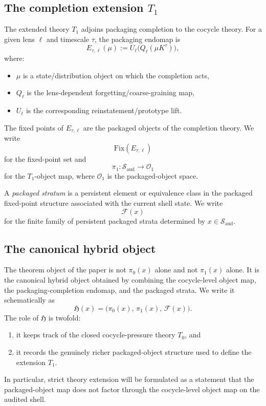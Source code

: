 \documentclass[11pt]{article}
\theoremstyle{definition}
\newcommand{\Tzero}{T_0}
\newcommand{\Tone}{T_1}
\begin{document}
\subsection{The completion extension \texorpdfstring{$\Tone$}{T1}}

The extended theory \(\Tone\) adjoins packaging completion to the cocycle theory. For a given lens \(\ell\) and timescale \(\tau\), the packaging endomap is
\[
E_{\tau,\ell}(\mu):=U_{\ell}\!\bigl(Q_{\ell}(\mu K^{\tau})\bigr),
\]
where:
\begin{itemize}
    \item \(\mu\) is a state/distribution object on which the completion acts,
    \item \(Q_{\ell}\) is the lens-dependent forgetting/coarse-graining map,
    \item \(U_{\ell}\) is the corresponding reinstatement/prototype lift.
\end{itemize}
The fixed points of \(E_{\tau,\ell}\) are the packaged objects of the completion theory. We write
\[
\mathrm{Fix}(E_{\tau,\ell})
\]
for the fixed-point set and
\[
\pi_1:\mathcal{S}_{\mathrm{aud}}\to \mathcal{O}_1
\]
for the \(\Tone\)-object map, where \(\mathcal{O}_1\) is the packaged-object space.

A \emph{packaged stratum} is a persistent element or equivalence class in the packaged fixed-point structure associated with the current shell state. We write
\[
\mathcal{F}(x)
\]
for the finite family of persistent packaged strata determined by \(x\in \mathcal{S}_{\mathrm{aud}}\).

\subsection{The canonical hybrid object}

The theorem object of the paper is not \(\pi_0(x)\) alone and not \(\pi_1(x)\) alone. It is the canonical hybrid object obtained by combining the cocycle-level object map, the packaging-completion endomap, and the packaged strata. We write it schematically as
\[
\mathfrak{H}(x)=\bigl(\pi_0(x),\,\pi_1(x),\,\mathcal{F}(x)\bigr).
\]
The role of \(\mathfrak{H}\) is twofold:
\begin{enumerate}
    \item it keeps track of the closed cocycle-pressure theory \(\Tzero\), and
    \item it records the genuinely richer packaged-object structure used to define the extension \(\Tone\).
\end{enumerate}
In particular, strict theory extension will be formulated as a statement that the packaged-object map does not factor through the cocycle-level object map on the audited shell.
\end{document}
